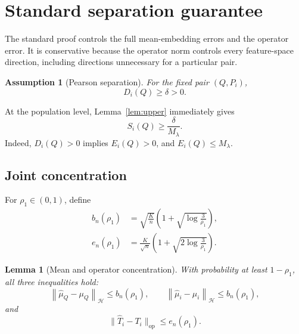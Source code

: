 \documentclass[11pt]{article}
\newcommand{\HH}{\mathcal H}
\newcommand{\norm}[1]{\left\lVert #1\right\rVert_{\HH}}
\newtheorem{assumption}{Assumption}
\newtheorem{lemma}{Lemma}
\begin{document}
\section{Standard separation guarantee}

The standard proof controls the full mean-embedding errors
and the operator error. It is conservative because the
operator norm controls every feature-space direction,
including directions unnecessary for a particular pair.

\begin{assumption}[Pearson separation]
\label{ass:separation}
For the fixed pair $(Q,P_i)$,
\[
D_i(Q)\ge\delta>0.
\]
\end{assumption}

At the population level, Lemma~\ref{lem:upper} immediately
gives
\begin{equation}
\boxed{S_i(Q)\ge\frac{\delta}{M_\lambda}.}
\label{eq:population-separation}
\end{equation}
Indeed, $D_i(Q)>0$ implies $E_i(Q)>0$, and
$E_i(Q)\le M_\lambda$.

\subsection{Joint concentration}

For $\rho_1\in(0,1)$, define
\begin{align}
b_n(\rho_1)
&=\sqrt{\frac Kn}
\left(1+\sqrt{\log\frac3{\rho_1}}\right),
\label{eq:b}
\\
e_n(\rho_1)
&=\frac K{\sqrt n}
\left(1+\sqrt{2\log\frac3{\rho_1}}\right).
\label{eq:e}
\end{align}

\begin{lemma}[Mean and operator concentration]
\label{lem:concentration}
With probability at least $1-\rho_1$, all three
inequalities hold:
\[
\norm{\widehat\mu_Q-\mu_Q}\le b_n(\rho_1),
\qquad
\norm{\widehat\mu_i-\mu_i}\le b_n(\rho_1),
\]
and
\[
\|\widehat T_i-T_i\|_{\mathrm{op}}\le e_n(\rho_1).
\]
\end{lemma}
\end{document}

